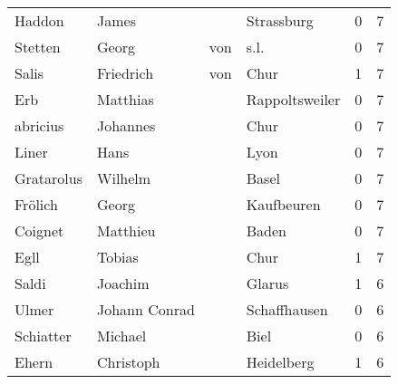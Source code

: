 \begin{center}
\begin{tiny}
\begin{longtabu}{llllrr}
                   Haddon &                              James &             &                                  Strassburg &          0 &         7 \\
                  Stetten &                              Georg &         von &                                        s.l. &          0 &         7 \\
                    Salis &                          Friedrich &         von &                                        Chur &          1 &         7 \\
                      Erb &                           Matthias &             &                              Rappoltsweiler &          0 &         7 \\
                 abricius &                           Johannes &             &                                        Chur &          0 &         7 \\
                    Liner &                               Hans &             &                                        Lyon &          0 &         7 \\
               Gratarolus &                            Wilhelm &             &                                       Basel &          0 &         7 \\
                  Frölich &                              Georg &             &                                  Kaufbeuren &          0 &         7 \\
                  Coignet &                           Matthieu &             &                                       Baden &          0 &         7 \\
                     Egll &                             Tobias &             &                                        Chur &          1 &         7 \\
                    Saldi &                            Joachim &             &                                      Glarus &          1 &         6 \\
                    Ulmer &                      Johann Conrad &             &                                Schaffhausen &          0 &         6 \\
                Schiatter &                            Michael &             &                                        Biel &          0 &         6 \\
                    Ehern &                          Christoph &             &                                  Heidelberg &          1 &         6 \\

\end{longtabu}
\end{tiny}
\end{center}
